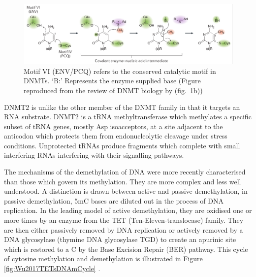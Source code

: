 \documentclass[
]{book}
\begin{document}
\begin{figure}

{\centering \includegraphics[width=0.8\linewidth]{figs/Lyko2017DNAmMechanism} 

}

\caption{Motif VI (ENV/PCQ) refers to the conserved catalytic motif in DNMTs. `B:' Represents the enzyme supplied base (Figure reproduced from the review of DNMT biology by \citet{Lyko2017} (fig.~1b))}\label{fig:Lyko2017DNAmMechanism}
\end{figure}



DNMT2 is unlike the other member of the DNMT family in that it targets an RNA substrate. DNMT2 is a tRNA methyltransferase which methylates a specific subset of tRNA genes, mostly Asp isoacceptors, at a site adjacent to the anticodon which protects them from endonucleolytic cleavage under stress conditions. Unprotected tRNAs produce fragments which complete with small interfering RNAs interfering with their signalling pathways.

The mechanisms of the demethylation of DNA were more recently characterised than those which govern its methylation. They are more complex and less well understood. A distinction is drawn between active and passive demethylation, in passive demethylation, 5mC bases are diluted out in the process of DNA replication. In the leading model of active demethylation, they are oxidised one or more times by an enzyme from the TET (Ten-Eleven-translocase) family. They are then either passively removed by DNA replication or actively removed by a DNA glycosylase (thymine DNA glycosylase TGD) to create an apurinic site which is restored to a C by the Base Excision Repair (BER) pathway. This cycle of cytosine methylation and demethylation is illustrated in Figure \ref{fig:Wu2017TETsDNAmCycle} \citep{Wu2017}.
\end{document}
